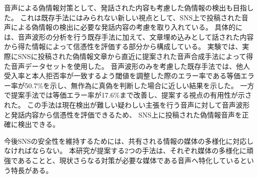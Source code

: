 音声による偽情報対策として、発話された内容も考慮した偽情報の検出も目指した。
これは既存手法にはみられない新しい視点として、SNS上で投稿された音声による偽情報の検出に必要な発話内容の考慮を取り入れている。
具体的には、音声波形の分析を行う既存手法に加えて、文章埋め込みとして話された内容から得た情報によって信憑性を評価する部分から構成している。
実験では、実際にSNSに投稿された偽情報文章から直近に提案された音声合成手法によって得た音声データセットを使用した。
音声波形のみを考慮した既存手法では、他人受入率と本人拒否率が一致するよう閾値を調整した際のエラー率である等価エラー率が50.7\%を示し、無作為に真偽を判断した場合に近しい結果を示した。
一方で提案手法では等価エラー率が17.6\%まで改善し、提案する視点の有用性が示された。
この手法は現在検出が難しい疑わしい主張を行う音声に対して音声波形と発話内容から信憑性を評価できるため、
SNS上に投稿された偽情報音声を正確に検出できる。

今後SNSの安全性を維持するためには、共有される情報の媒体の多様化に対応しなければならない。
本研究が提案する2つの手法は、それぞれ媒体の多様化に頑強であることと、現状さらなる対策が必要な媒体である音声へ特化しているという特長がある。
